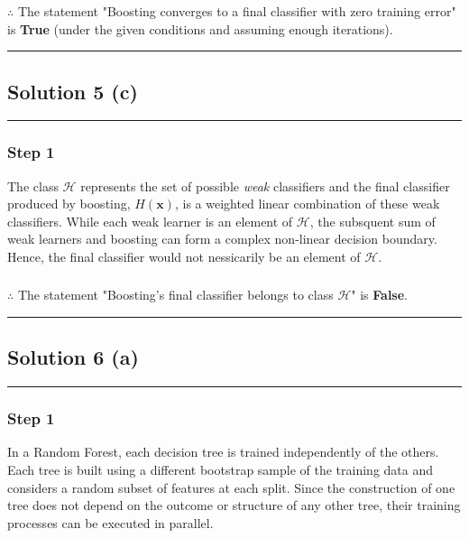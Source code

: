 \documentclass{article}
\begin{document}
\subsubsection*{\normalfont}{$\therefore$ The statement "Boosting converges to a final classifier with zero training error" is \textbf{True} (under the given conditions and assuming enough iterations).}


\noindent\rule{\textwidth}{0.4pt}

\newpage

\subsection*{Solution 5 (c)}
\noindent\rule{\textwidth}{0.4pt}

\subsubsection*{Step 1}
\parbox{\textwidth}{
The class $\mathcal H$ represents the set of possible \emph{weak} classifiers and the final classifier produced by boosting, $H(\mathbf{x})$, is a weighted linear combination of these weak classifiers.
While each weak learner is an element of $\mathcal H$, the subsquent sum of weak learners and boosting can form a complex non-linear decision boundary. Hence, the final classifier would not nessicarily be an element of $\mathcal H$.
}

\subsubsection*{\normalfont}{$\therefore$ The statement "Boosting's final classifier belongs to class $\mathcal H$" is \textbf{False}.}

\noindent\rule{\textwidth}{0.4pt}

\newpage

\subsection*{Solution 6 (a)}
\noindent\rule{\textwidth}{0.4pt}

\subsubsection*{Step 1}
\parbox{\textwidth}{
In a Random Forest, each decision tree is trained independently of the others. Each tree is built using a different bootstrap sample of the training data and considers a random subset of features at each split. Since the construction of one tree does not depend on the outcome or structure of any other tree, their training processes can be executed in parallel.
}
\end{document}
